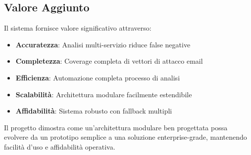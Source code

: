 \documentclass{article}
\begin{document}
\subsection{Valore Aggiunto}

Il sistema fornisce valore significativo attraverso:

\begin{itemize}
    \item \textbf{Accuratezza}: Analisi multi-servizio riduce false negative
    \item \textbf{Completezza}: Coverage completa di vettori di attacco email
    \item \textbf{Efficienza}: Automazione completa processo di analisi
    \item \textbf{Scalabilità}: Architettura modulare facilmente estendibile
    \item \textbf{Affidabilità}: Sistema robusto con fallback multipli
\end{itemize}

Il progetto dimostra come un'architettura modulare ben progettata possa evolvere da un prototipo semplice a una soluzione enterprise-grade, mantenendo facilità d'uso e affidabilità operativa.
\end{document}
